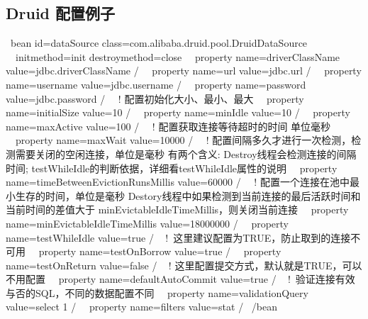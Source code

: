 \documentclass[letterpaper,10pt,english]{sphinxmanual}
\begin{document}
\subsection{Druid 配置例子}
\label{\detokenize{interface/druid:id2}}
\begin{sphinxVerbatim}[commandchars=\\\{\}]
 \PYGZlt{}bean id=\PYGZdq{}dataSource\PYGZdq{} class=\PYGZdq{}com.alibaba.druid.pool.DruidDataSource\PYGZdq{}
  init\PYGZhy{}method=\PYGZdq{}init\PYGZdq{} destroy\PYGZhy{}method=\PYGZdq{}close\PYGZdq{}\PYGZgt{}
  \PYGZlt{}property name=\PYGZdq{}driverClassName\PYGZdq{} value=\PYGZdq{}\PYGZdl{}\PYGZob{}jdbc.driverClassName\PYGZcb{}\PYGZdq{} /\PYGZgt{}
  \PYGZlt{}property name=\PYGZdq{}url\PYGZdq{} value=\PYGZdq{}\PYGZdl{}\PYGZob{}jdbc.url\PYGZcb{}\PYGZdq{} /\PYGZgt{}
  \PYGZlt{}property name=\PYGZdq{}username\PYGZdq{} value=\PYGZdq{}\PYGZdl{}\PYGZob{}jdbc.username\PYGZcb{}\PYGZdq{} /\PYGZgt{}
  \PYGZlt{}property name=\PYGZdq{}password\PYGZdq{} value=\PYGZdq{}\PYGZdl{}\PYGZob{}jdbc.password\PYGZcb{}\PYGZdq{} /\PYGZgt{}
  \PYGZlt{}!\PYGZhy{}\PYGZhy{} 配置初始化大小、最小、最大 \PYGZhy{}\PYGZhy{}\PYGZgt{}
  \PYGZlt{}property name=\PYGZdq{}initialSize\PYGZdq{} value=\PYGZdq{}10\PYGZdq{} /\PYGZgt{}
  \PYGZlt{}property name=\PYGZdq{}minIdle\PYGZdq{} value=\PYGZdq{}10\PYGZdq{} /\PYGZgt{}
  \PYGZlt{}property name=\PYGZdq{}maxActive\PYGZdq{} value=\PYGZdq{}100\PYGZdq{} /\PYGZgt{}
  \PYGZlt{}!\PYGZhy{}\PYGZhy{} 配置获取连接等待超时的时间 单位毫秒\PYGZhy{}\PYGZhy{}\PYGZgt{}
  \PYGZlt{}property name=\PYGZdq{}maxWait\PYGZdq{} value=\PYGZdq{}10000\PYGZdq{} /\PYGZgt{}
  \PYGZlt{}!\PYGZhy{}\PYGZhy{} 配置间隔多久才进行一次检测，检测需要关闭的空闲连接，单位是毫秒
有两个含义:
Destroy线程会检测连接的间隔时间;
testWhileIdle的判断依据，详细看testWhileIdle属性的说明\PYGZhy{}\PYGZhy{}\PYGZgt{}
  \PYGZlt{}property name=\PYGZdq{}timeBetweenEvictionRunsMillis\PYGZdq{} value=\PYGZdq{}60000\PYGZdq{} /\PYGZgt{}
  \PYGZlt{}!\PYGZhy{}\PYGZhy{} 配置一个连接在池中最小生存的时间，单位是毫秒
Destory线程中如果检测到当前连接的最后活跃时间和当前时间的差值大于
minEvictableIdleTimeMillis，则关闭当前连接 \PYGZhy{}\PYGZhy{}\PYGZgt{}
  \PYGZlt{}property name=\PYGZdq{}minEvictableIdleTimeMillis\PYGZdq{} value=\PYGZdq{}18000000\PYGZdq{} /\PYGZgt{}
  \PYGZlt{}property name=\PYGZdq{}testWhileIdle\PYGZdq{} value=\PYGZdq{}true\PYGZdq{} /\PYGZgt{}
  \PYGZlt{}!\PYGZhy{}\PYGZhy{} 这里建议配置为TRUE，防止取到的连接不可用 \PYGZhy{}\PYGZhy{}\PYGZgt{}
  \PYGZlt{}property name=\PYGZdq{}testOnBorrow\PYGZdq{} value=\PYGZdq{}true\PYGZdq{} /\PYGZgt{}
  \PYGZlt{}property name=\PYGZdq{}testOnReturn\PYGZdq{} value=\PYGZdq{}false\PYGZdq{} /\PYGZgt{}
  \PYGZlt{}!\PYGZhy{}\PYGZhy{} 这里配置提交方式，默认就是TRUE，可以不用配置 \PYGZhy{}\PYGZhy{}\PYGZgt{}
  \PYGZlt{}property name=\PYGZdq{}defaultAutoCommit\PYGZdq{} value=\PYGZdq{}true\PYGZdq{} /\PYGZgt{}
  \PYGZlt{}!\PYGZhy{}\PYGZhy{} 验证连接有效与否的SQL，不同的数据配置不同 \PYGZhy{}\PYGZhy{}\PYGZgt{}
  \PYGZlt{}property name=\PYGZdq{}validationQuery\PYGZdq{} value=\PYGZdq{}select 1 \PYGZdq{} /\PYGZgt{}
  \PYGZlt{}property name=\PYGZdq{}filters\PYGZdq{} value=\PYGZdq{}stat\PYGZdq{} /\PYGZgt{}
 \PYGZlt{}/bean\PYGZgt{}
\end{sphinxVerbatim}
\end{document}
